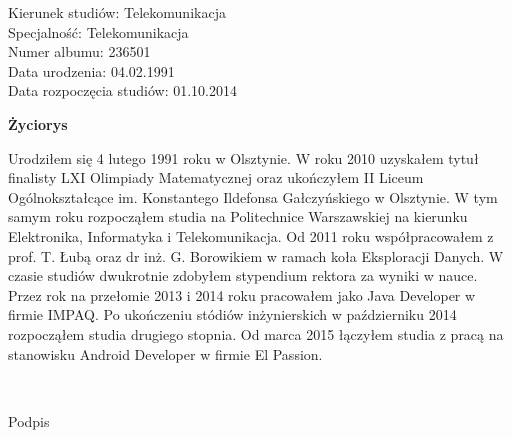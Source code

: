 	\newpage
	\thispagestyle{empty}

\begin{flushright}

  \begin{varwidth}[t]{\textwidth}
	Kierunek studiów: Telekomunikacja\\
	Specjalność: Telekomunikacja \\
	Numer albumu: 236501\\
	Data urodzenia: 04.02.1991 \\
	Data rozpoczęcia studiów: 01.10.2014 \\
  \end{varwidth}

\end{flushright}

\begin{center}
    \textbf{\textbf{Życiorys}}
\end{center}

	\vspace{0.5cm}

Urodziłem się 4 lutego 1991 roku w Olsztynie.
W roku 2010 uzyskałem tytuł finalisty LXI Olimpiady Matematycznej oraz
ukończyłem II Liceum Ogólnokształcące im. Konstantego Ildefonsa Gałczyńskiego w Olsztynie.
W tym samym roku rozpocząłem studia na Politechnice Warszawskiej na kierunku Elektronika, Informatyka i Telekomunikacja.
Od 2011 roku współpracowałem z prof. T. Łubą oraz dr inż. G. Borowikiem w ramach koła Eksploracji Danych.
W czasie studiów dwukrotnie zdobyłem stypendium rektora za wyniki w nauce.
Przez rok na przełomie 2013 i 2014 roku pracowałem jako Java Developer w firmie IMPAQ.
Po ukończeniu stódiów inżynierskich w październiku 2014 rozpocząłem studia drugiego stopnia.
Od marca 2015 łączyłem studia z pracą na stanowisku Android Developer w firmie El Passion.

	\vspace{1cm}

\begin{flushright}
	\begin{minipage}{5cm}
		\dotfill \\[-0.7cm]
		\begin{center}
		\small Podpis
		\end{center}
	\end{minipage}
\end{flushright}

	\vspace{2cm}
